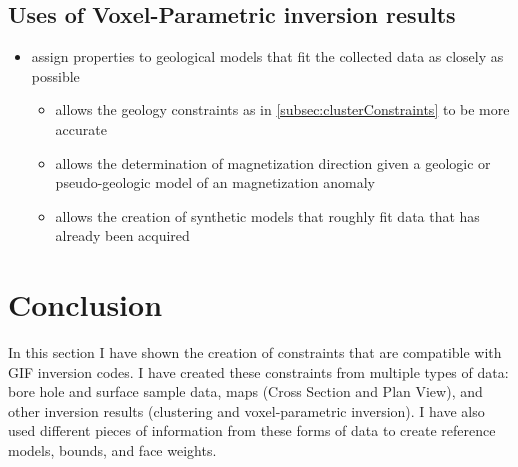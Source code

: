 \subsection{Uses of Voxel-Parametric inversion results}
\label{subsec:voxelParamUses}

 \begin{itemize}
  \item assign properties to geological models that fit the collected data as closely as possible
  \begin{itemize}
   \item allows the geology constraints as in \autoref{subsec:clusterConstraints} to be more accurate
   \item allows the determination of magnetization direction given a geologic or pseudo-geologic model of an magnetization anomaly   
   \item allows the creation of synthetic models that roughly fit data that has already been acquired
  \end{itemize}
 \end{itemize}

\section{Conclusion}
\label{sec:GIFtoolsConc}

In this section I have shown the creation of constraints that are compatible with \ac{GIF} inversion codes. I have created these constraints from multiple types of data: bore hole and surface sample data, maps (Cross Section and Plan View), and other inversion results (clustering and voxel-parametric inversion). I have also  used different pieces of information from these forms of data to create reference models, bounds, and face weights.



%

\endinput

Any text after an \endinput is ignored.
You could put scraps here or things in progress.
